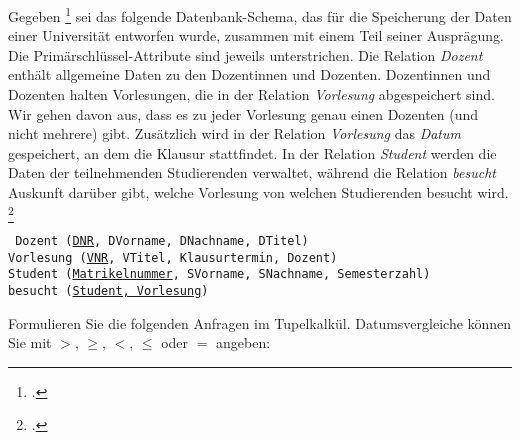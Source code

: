 \documentclass{lehramt-informatik-aufgabe}
\begin{document}

Gegeben \footcite[Thema 2 Teilaufgabe 1 Aufgabe 4
Seite 12-13]{examen:66116:2018:03} sei das folgende Datenbank-Schema,
das für die Speicherung der Daten einer Universität entworfen wurde,
zusammen mit einem Teil seiner Ausprägung. Die Primärschlüssel-Attribute
sind jeweils unterstrichen. Die Relation \emph{Dozent} enthält
allgemeine Daten zu den Doz\-entinnen und Dozenten. Dozentinnen und
Dozenten halten Vorlesungen, die in der Relation \emph{Vorlesung}
abgespeichert sind. Wir gehen davon aus, dass es zu jeder Vorlesung
genau einen Dozenten (und nicht mehrere) gibt. Zusätzlich wird in der
Relation \emph{Vorlesung} das \emph{Datum} gespeichert, an dem die
Klausur stattfindet. In der Relation \emph{Student} werden die Daten der
teilnehmenden Studierenden verwaltet, während die Relation
\emph{besucht} Auskunft darüber gibt, welche Vorlesung von welchen
Studierenden besucht wird.
\footcite[Seite 4-5]{db:ab:3}

\begin{mdframed}
\tt
Dozent (\underline{DNR}, DVorname, DNachname, DTitel)\\
Vorlesung (\underline{VNR}, VTitel, Klausurtermin, Dozent)\\
Student (\underline{Matrikelnummer}, SVorname, SNachname, Semesterzahl)\\
besucht (\underline{Student, Vorlesung})
\end{mdframed}

Formulieren Sie die folgenden Anfragen im Tupelkalkül. Datumsvergleiche
können Sie mit $>$, $\geq$, $<$, $\leq$ oder $=$ angeben:
\end{document}
